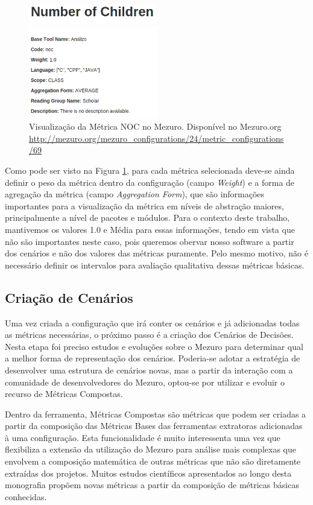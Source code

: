 \graphicspath{{figuras/}}
\begin{figure}[h]
\centering
\includegraphics[width=0.5\textwidth]{metric_example}
\caption{Visualização da Métrica NOC no Mezuro. Disponível no Mezuro.org \url{http://mezuro.org/mezuro_configurations/24/metric_configurations/69}}
\label{metric_example}
\end{figure}

Como pode ser visto na Figura \ref{metric_example}, para cada métrica selecionada deve-se ainda definir o peso da métrica dentro da configuração (campo \emph{Weight}) e a forma de agregação da métrica (campo \emph{Aggregation Form}), que são informações importantes para a visualização da métrica em níveis de abstração maiores, principalmente a nível de pacotes e módulos. Para o contexto deste trabalho, mantivemos os valores 1.0 e Média para essas informações, tendo em vista que não são importantes neste caso, pois queremos obervar nosso software a partir dos cenários e não dos valores das métricas puramente. Pelo mesmo motivo, não é necessário definir os intervalos para avaliação qualitativa dessas métricas básicas.

\subsection{Criação de Cenários}

Uma vez criada a configuração que irá conter os cenários e já adicionadas todas as métricas necessárias, o próximo passo é a criação dos Cenários de Decisões. Nesta etapa foi preciso estudos e evoluções sobre o Mezuro para determinar qual a melhor forma de representação dos cenários. Poderia-se adotar a estratégia de desenvolver uma estrutura de cenários novas, mas a partir da interação com a comunidade de desenvolvedores do Mezuro, optou-se por utilizar e evoluir o recurso de Métricas Compostas.

Dentro da ferramenta, Métricas Compostas são métricas que podem ser criadas a partir da composição das Métricas Bases das ferramentas extratoras adicionadas à uma configuração. Esta funcionalidade é muito interessenta uma vez que flexibiliza a extensão da utilização do Mezuro para análise mais complexas que envolvem a composição matemática de outras métricas que não são diretamente extraídas dos projetos. Muitos estudos científicos apresentados ao longo desta monografia propõem novas métricas a partir da composição de métricas básicas conhecidas.

